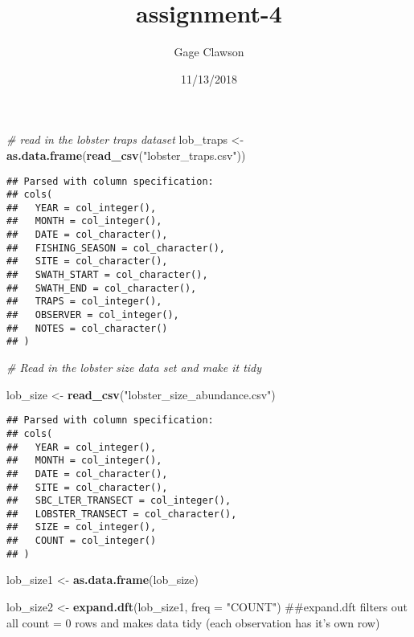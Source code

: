 \documentclass[]{article}
\title{assignment-4}
\author{Gage Clawson}
\date{11/13/2018}
\newenvironment{Shaded}{\begin{snugshade}}{\end{snugshade}}
\newcommand{\KeywordTok}[1]{\textcolor[rgb]{0.13,0.29,0.53}{\textbf{{#1}}}}
\newcommand{\DataTypeTok}[1]{\textcolor[rgb]{0.13,0.29,0.53}{{#1}}}
\newcommand{\StringTok}[1]{\textcolor[rgb]{0.31,0.60,0.02}{{#1}}}
\newcommand{\CommentTok}[1]{\textcolor[rgb]{0.56,0.35,0.01}{\textit{{#1}}}}
\newcommand{\NormalTok}[1]{{#1}}
\begin{document}
\maketitle

\begin{Shaded}
\begin{Highlighting}[]
\CommentTok{# read in the lobster traps dataset}
\NormalTok{lob_traps <-}\StringTok{ }\KeywordTok{as.data.frame}\NormalTok{(}\KeywordTok{read_csv}\NormalTok{(}\StringTok{"lobster_traps.csv"}\NormalTok{))}
\end{Highlighting}
\end{Shaded}

\begin{verbatim}
## Parsed with column specification:
## cols(
##   YEAR = col_integer(),
##   MONTH = col_integer(),
##   DATE = col_character(),
##   FISHING_SEASON = col_character(),
##   SITE = col_character(),
##   SWATH_START = col_character(),
##   SWATH_END = col_character(),
##   TRAPS = col_integer(),
##   OBSERVER = col_integer(),
##   NOTES = col_character()
## )
\end{verbatim}

\begin{Shaded}
\begin{Highlighting}[]
\CommentTok{# Read in the lobster size data set and make it tidy}

\NormalTok{lob_size <-}\StringTok{ }\KeywordTok{read_csv}\NormalTok{(}\StringTok{"lobster_size_abundance.csv"}\NormalTok{)}
\end{Highlighting}
\end{Shaded}

\begin{verbatim}
## Parsed with column specification:
## cols(
##   YEAR = col_integer(),
##   MONTH = col_integer(),
##   DATE = col_character(),
##   SITE = col_character(),
##   SBC_LTER_TRANSECT = col_integer(),
##   LOBSTER_TRANSECT = col_character(),
##   SIZE = col_integer(),
##   COUNT = col_integer()
## )
\end{verbatim}

\begin{Shaded}
\begin{Highlighting}[]
\NormalTok{lob_size1 <-}\StringTok{ }\KeywordTok{as.data.frame}\NormalTok{(lob_size)}

\NormalTok{lob_size2 <-}\StringTok{ }\KeywordTok{expand.dft}\NormalTok{(lob_size1, }\DataTypeTok{freq =} \StringTok{"COUNT"}\NormalTok{) ##expand.dft filters out all count = 0 rows and makes data tidy (each observation has it's own row)}
\end{Highlighting}
\end{Shaded}
\end{document}
